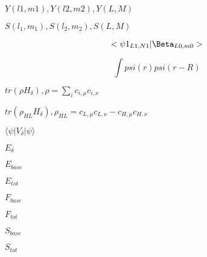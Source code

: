 \documentclass{article}
\begin{document}
$ Y(l1,m1), Y(l2,m2), Y(L,M) $
\pagebreak

$ S(l_1,m_1), S(l_2,m_2), S(L,M) $
\pagebreak

\[ <\psi1_{L1,N1}|\Beta_{L0,m0}> \]
\pagebreak

\[ \int psi(r) psi(r-R)\]
\pagebreak

$tr(\rho H_\delta), \rho = \sum_i{c_{i, \mu}c_{i,\nu}} $
\pagebreak

$tr(\rho_{HL} H_\delta), \rho_{HL} = c_{L, \mu}c_{L,\nu} - c_{H, \mu}c_{H,\nu} $
\pagebreak

$\langle\psi|V_\delta|\psi\rangle$
\pagebreak

$E_{\delta}$
\pagebreak

$E_{base}$
\pagebreak

$E_{tot}$
\pagebreak

$F_{base}$
\pagebreak

$F_{tot}$
\pagebreak

$S_{base}$
\pagebreak

$S_{tot}$
\pagebreak
\end{document}
